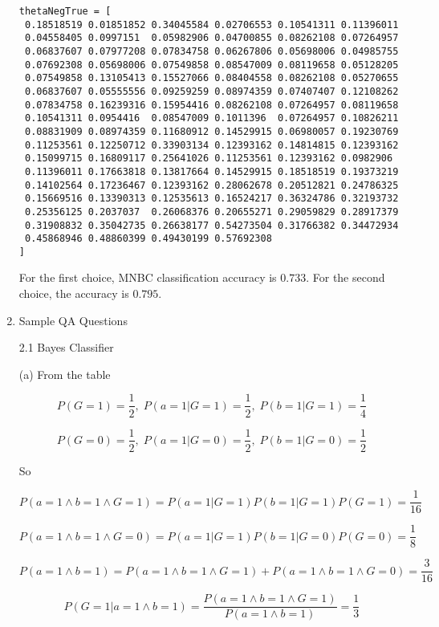 \documentclass[11pt]{article}
\begin{document}
\begin{enumerate}
\begin{verbatim}
thetaNegTrue = [
 0.18518519 0.01851852 0.34045584 0.02706553 0.10541311 0.11396011
 0.04558405 0.0997151  0.05982906 0.04700855 0.08262108 0.07264957
 0.06837607 0.07977208 0.07834758 0.06267806 0.05698006 0.04985755
 0.07692308 0.05698006 0.07549858 0.08547009 0.08119658 0.05128205
 0.07549858 0.13105413 0.15527066 0.08404558 0.08262108 0.05270655
 0.06837607 0.05555556 0.09259259 0.08974359 0.07407407 0.12108262
 0.07834758 0.16239316 0.15954416 0.08262108 0.07264957 0.08119658
 0.10541311 0.0954416  0.08547009 0.1011396  0.07264957 0.10826211
 0.08831909 0.08974359 0.11680912 0.14529915 0.06980057 0.19230769
 0.11253561 0.12250712 0.33903134 0.12393162 0.14814815 0.12393162
 0.15099715 0.16809117 0.25641026 0.11253561 0.12393162 0.0982906
 0.11396011 0.17663818 0.13817664 0.14529915 0.18518519 0.19373219
 0.14102564 0.17236467 0.12393162 0.28062678 0.20512821 0.24786325
 0.15669516 0.13390313 0.12535613 0.16524217 0.36324786 0.32193732
 0.25356125 0.2037037  0.26068376 0.20655271 0.29059829 0.28917379
 0.31908832 0.35042735 0.26638177 0.54273504 0.31766382 0.34472934
 0.45868946 0.48860399 0.49430199 0.57692308
]
\end{verbatim}

For the first choice, MNBC classification accuracy is $0.733$. For the second choice, the accuracy is $0.795$.

\medskip

\item
Sample QA Questions

\medskip

2.1 Bayes Classifier

\medskip

(a)
From the table

$$
P(G=1) = \frac{1}{2} ,\;
P(a=1|G=1) = \frac{1}{2} ,\;
P(b=1|G=1) = \frac{1}{4}
$$

$$
P(G=0) = \frac{1}{2} ,\;
P(a=1|G=0) = \frac{1}{2} ,\;
P(b=1|G=0) = \frac{1}{2}
$$

So

$$
P(a=1 \land b=1 \land G=1) = P(a=1|G=1)P(b=1|G=1)P(G=1) = \frac{1}{16}
$$

$$
P(a=1 \land b=1 \land G=0) = P(a=1|G=1)P(b=1|G=0)P(G=0) = \frac{1}{8}
$$

$$
P(a=1 \land b=1) = P(a=1 \land b=1 \land G=1) + P(a=1 \land b=1 \land G=0) = \frac{3}{16}
$$

$$
P(G=1|a=1 \land b=1) = \frac{P(a=1 \land b=1 \land G=1)}{P(a=1 \land b=1)} = \frac{1}{3}
$$


\end{enumerate}
\end{document}
